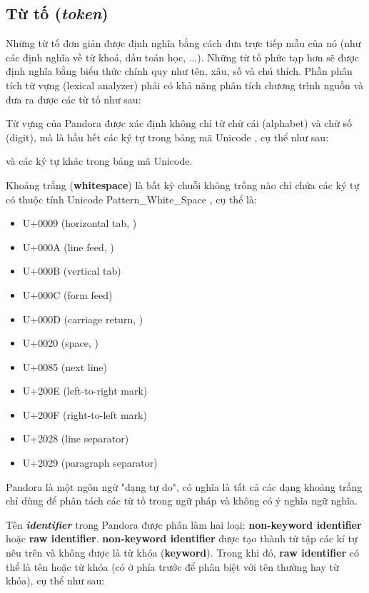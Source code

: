 \subsection{Từ tố (\textit{token})}
    Những từ tố đơn giản được định nghĩa bằng cách đưa trực tiếp mẫu của nó (như các định nghĩa về từ khoá, dấu toán học, ...). Những từ tố phức tạp hơn sẽ được định nghĩa bằng biểu thức chính quy như tên, xâu, số và chú thích. Phần phân tích từ vựng (lexical analyzer) phải có khả năng phân tích chương trình nguồn và đưa ra được các từ tố như sau:



    Từ vựng của Pandora được xác định không chỉ từ chữ cái (alphabet) và chữ số (digit), mà là hầu hết các ký tự trong bảng mã Unicode \cite{allen2012unicode}, cụ thể như sau:

    \regexdigit

    \regexalphabet

\noindent và các ký tự khác trong bảng mã Unicode.

    Khoảng trắng (\textbf{whitespace}) là bất kỳ chuỗi không trống nào chỉ chứa các ký tự có thuộc tính Unicode Pattern\_White\_Space \cite{web:unicode:report}, cụ thể là:
    \begin{itemize}
        \item{U+0009 (horizontal tab, )}
        \item{U+000A (line feed, )}
        \item{U+000B (vertical tab)}
        \item{U+000C (form feed)}
        \item{U+000D (carriage return, )}
        \item{U+0020 (space, )}
        \item{U+0085 (next line)}
        \item{U+200E (left-to-right mark)}
        \item{U+200F (right-to-left mark)}
        \item{U+2028 (line separator)}
        \item{U+2029 (paragraph separator)}
    \end{itemize}
\noindent Pandora là một ngôn ngữ "dạng tự do", có nghĩa là tất cả các dạng khoảng trắng chỉ dùng để phân tách các từ tố trong ngữ pháp và không có ý nghĩa ngữ nghĩa.

    Tên \textbf{\textit{identifier}} trong Pandora được phân làm hai loại: \textbf{non-keyword identifier} hoặc \textbf{raw identifier}. \textbf{non-keyword identifier} được tạo thành từ tập các kí tự nêu trên và không được là từ khóa (\textbf{keyword}). Trong khi đó, \textbf{raw identifier} có thể là tên hoặc từ khóa (có  ở phía trước để phân biệt với tên thường hay từ khóa), cụ thể như sau:

